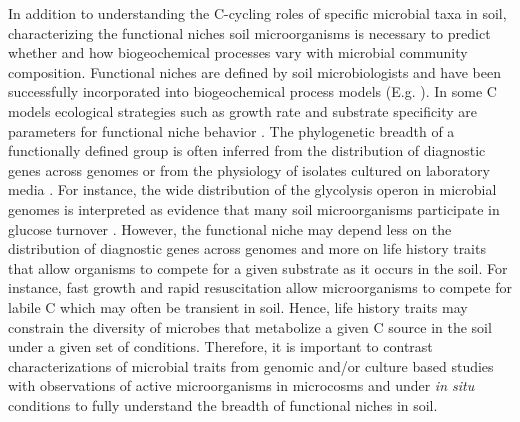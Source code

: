 In addition to understanding the C-cycling roles of specific microbial taxa in
soil, characterizing the functional niches soil microorganisms is necessary to
predict whether and how biogeochemical processes vary with microbial community
composition. Functional niches are defined by soil microbiologists and have
been successfully incorporated into biogeochemical process models (E.g.
\citep{wieder_2014a,Kaiser2014a}). In some C models ecological strategies such
as growth rate and substrate specificity are parameters for functional niche
behavior \citep{Kaiser2014a}. The phylogenetic breadth of a functionally
defined group is often inferred from the distribution of diagnostic genes
across genomes \citep{Berlemont2013} or from the physiology of isolates
cultured on laboratory media \citep{Martiny2013}. For instance, the wide
distribution of the glycolysis operon in microbial genomes is interpreted as
evidence that many soil microorganisms participate in glucose turnover
\citep{McGuire2010}. However, the functional niche may depend less on the
distribution of diagnostic genes across genomes and more on life history traits
that allow organisms to compete for a given substrate as it occurs in the soil.
For instance, fast growth and rapid resuscitation allow microorganisms to
compete for labile C which may often be transient in soil. Hence, life history
traits may constrain the diversity of microbes that metabolize a given C source
in the soil under a given set of conditions. Therefore, it is important to
contrast characterizations of microbial traits from genomic and/or culture
based studies with observations of active microorganisms in microcosms and
under \textit{in situ} conditions to fully understand the breadth of 
functional niches in soil.

